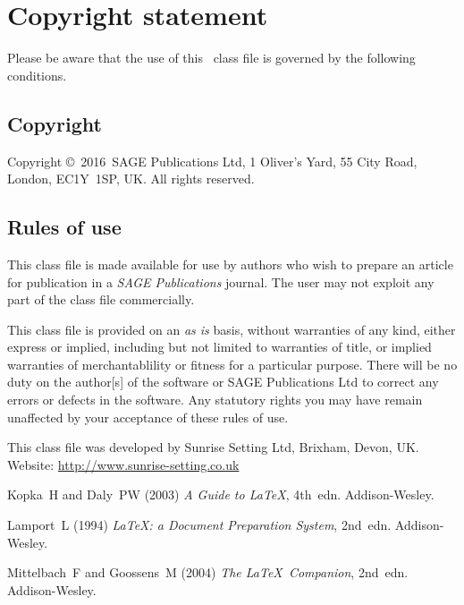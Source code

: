 \documentclass[Afour,sageh,times]{sagej}
\def\volumeyear{2016}
\begin{document}
%

\section{Copyright statement}
Please  be  aware that the use of  this \LaTeXe\ class file is
governed by the following conditions.

\subsection{Copyright}
Copyright \copyright\ \volumeyear\ SAGE Publications Ltd,
1 Oliver's Yard, 55 City Road, London, EC1Y~1SP, UK. All
rights reserved.

\subsection{Rules of use}
This class file is made available for use by authors who wish to
prepare an article for publication in a \textit{SAGE Publications} journal.
The user may not exploit any
part of the class file commercially.

This class file is provided on an \textit{as is}  basis, without
warranties of any kind, either express or implied, including but
not limited to warranties of title, or implied  warranties of
merchantablility or fitness for a particular purpose. There will
be no duty on the author[s] of the software or SAGE Publications Ltd
to correct any errors or defects in the software. Any
statutory  rights you may have remain unaffected by your
acceptance of these rules of use.

\begin{acks}
This class file was developed by Sunrise Setting Ltd,
Brixham, Devon, UK.\\
Website: \url{http://www.sunrise-setting.co.uk}
\end{acks}

\begin{thebibliography}{99}
Kopka~H and Daly~PW (2003) \textit{A Guide to \LaTeX}, 4th~edn.
Addison-Wesley.

Lamport~L (1994) \textit{\LaTeX: a Document Preparation System},
2nd~edn. Addison-Wesley.

Mittelbach~F and Goossens~M (2004) \textit{The \LaTeX\ Companion},
2nd~edn. Addison-Wesley.

\end{thebibliography}
\end{document}
